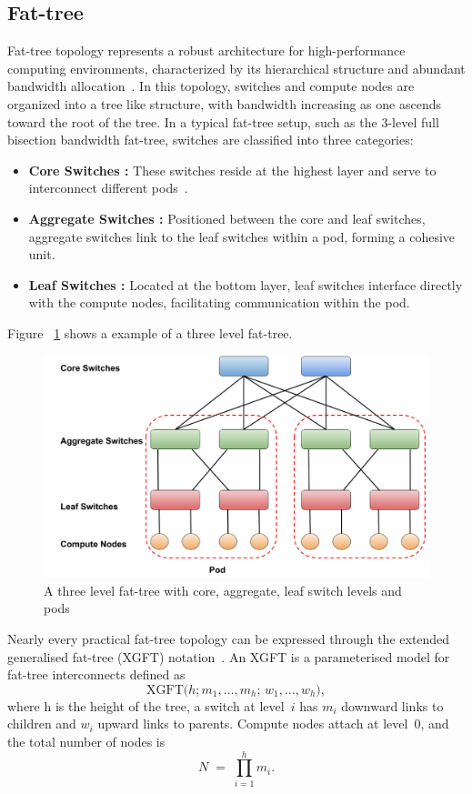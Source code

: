 \subsection{Fat-tree} Fat-tree topology represents a robust architecture for
high-performance computing environments, characterized by its hierarchical
structure and abundant bandwidth allocation~\cite{leiserson1985fat}. In this topology, switches and
compute nodes are organized into a tree like structure, with bandwidth
increasing as one ascends toward the root of the tree. In a typical fat-tree setup, such as the 3-level full bisection bandwidth
fat-tree, switches are classified into three categories: 

\begin{itemize} 
\item \textbf{Core Switches :} These switches reside at the highest layer and serve to interconnect different pods~\cite{al2008scalable}.
\item \textbf{Aggregate Switches :} Positioned between the core and leaf switches, aggregate switches link to the leaf switches within a pod, forming a cohesive unit.
\item \textbf{Leaf Switches :} Located at the bottom layer, leaf switches interface directly with the compute nodes, facilitating communication within the pod.
\end{itemize} 
Figure ~\ref{fig:ftree_ex} shows a example of a three level fat-tree.
\begin{figure}[h!]
  \centering
  \includegraphics[width=0.8\columnwidth]{./figs/ftree_ex.png}
  \caption{A three level fat-tree with core, aggregate, leaf switch levels and pods}
  \label{fig:ftree_ex}
\end{figure} 


Nearly every practical fat-tree topology can be expressed through the extended generalised fat-tree (XGFT) notation~\cite{nienaber2014effective}. An XGFT is a parameterised model for fat-tree interconnects defined as
\[
\mathrm{XGFT}\!\bigl(h; m_{1},\ldots,m_{h};\, w_{1},\ldots,w_{h}\bigr),
\]
where h is the height of the tree, a switch at level~$i$ has \(m_{i}\) downward links to children and \(w_{i}\) upward links to parents. Compute nodes attach at level~0, and the total number of nodes is
\[
N \;=\; \prod_{i=1}^{h} m_{i}.
\]

